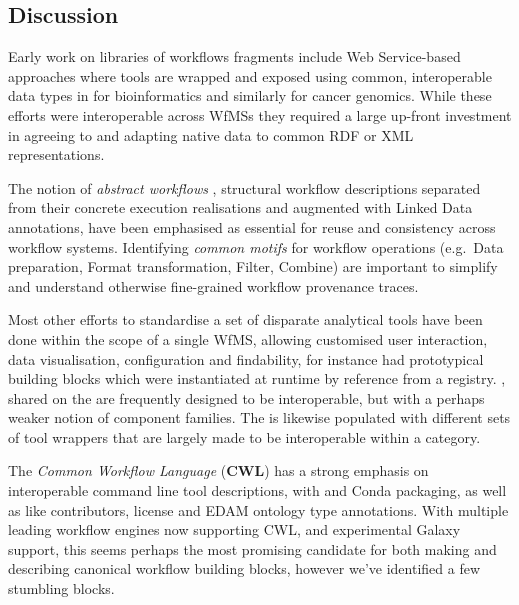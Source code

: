 \subsection{Discussion}\label{ch6:discussion}

Early work on libraries of workflows fragments include Web Service-based
approaches where tools are wrapped and exposed using common,
interoperable data types in 
\cite{ch6-27} for bioinformatics and similarly
 \cite{ch6-28} for cancer
genomics. While these efforts were interoperable across WfMSs they
required a large up-front investment in agreeing to and adapting native
data to common RDF or XML representations.

The notion of \emph{abstract workflows} \cite{Garijo 2011}, structural workflow
descriptions separated from their concrete execution realisations and
augmented with Linked Data annotations, have been emphasised as
essential for reuse and consistency across workflow systems. Identifying
\emph{common motifs} for workflow operations \cite{ch6-30} (e.g.~Data
preparation, Format transformation, Filter, Combine) are important to
simplify and understand otherwise fine-grained workflow provenance
traces.

Most other efforts to standardise a set of disparate analytical tools
have been done within the scope of a single WfMS, allowing customised
user interaction, data visualisation, configuration and findability, for
instance
 had prototypical building blocks \cite{ch6-31} which were
instantiated at runtime by reference from a registry.
, shared on the
 are frequently designed to be
interoperable, but with a perhaps weaker notion of component families.
The  \cite{ch6-32} is
likewise populated with different sets of tool wrappers that are largely
made to be interoperable within a category.

The \emph{Common Workflow Language} (\textbf{CWL}) \cite{Crusoe 2022} has a strong
emphasis on interoperable command line tool descriptions, with
 and Conda packaging, as well as
 like contributors, license and EDAM ontology type annotations.
With multiple leading workflow engines now supporting CWL, and
experimental Galaxy support, this seems perhaps the most promising
candidate for both making and describing canonical workflow building
blocks, however we've identified a few stumbling blocks.

